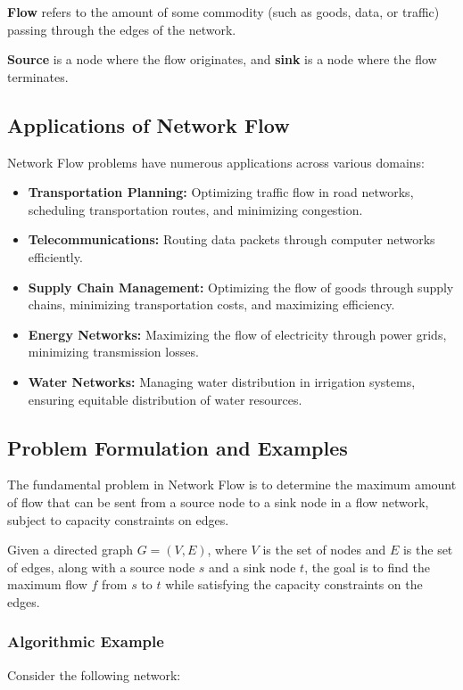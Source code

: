 \documentclass[12pt]{book} %
\begin{document}
\textbf{Flow} refers to the amount of some commodity (such as goods, data, or traffic) passing through the edges of the network.

\textbf{Source} is a node where the flow originates, and \textbf{sink} is a node where the flow terminates.

\subsection{Applications of Network Flow}
Network Flow problems have numerous applications across various domains:

\begin{itemize}
    \item \textbf{Transportation Planning:} Optimizing traffic flow in road networks, scheduling transportation routes, and minimizing congestion.
    \item \textbf{Telecommunications:} Routing data packets through computer networks efficiently.
    \item \textbf{Supply Chain Management:} Optimizing the flow of goods through supply chains, minimizing transportation costs, and maximizing efficiency.
    \item \textbf{Energy Networks:} Maximizing the flow of electricity through power grids, minimizing transmission losses.
    \item \textbf{Water Networks:} Managing water distribution in irrigation systems, ensuring equitable distribution of water resources.
\end{itemize}

\subsection{Problem Formulation and Examples}
The fundamental problem in Network Flow is to determine the maximum amount of flow that can be sent from a source node to a sink node in a flow network, subject to capacity constraints on edges.

Given a directed graph \( G = (V, E) \), where \( V \) is the set of nodes and \( E \) is the set of edges, along with a source node \( s \) and a sink node \( t \), the goal is to find the maximum flow \( f \) from \( s \) to \( t \) while satisfying the capacity constraints on the edges.

\subsubsection{Algorithmic Example}
Consider the following network:
\end{document}
